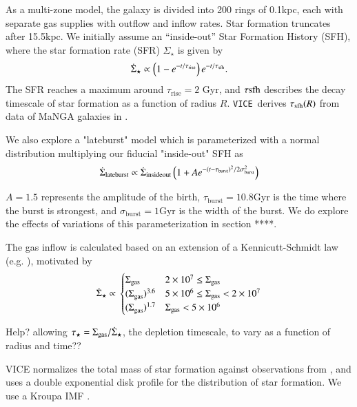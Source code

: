 \documentclass[12pt,oneside]{report}
\newcommand{\VICE}{\texttt{VICE}}
\begin{document}
As a multi-zone model, the galaxy is divided into 200 rings of 0.1kpc, each with separate gas supplies with outflow and inflow rates. Star formation truncates after 15.5kpc. We initially assume an ``inside-out'' Star Formation History (SFH), where the star formation rate (SFR) $\Sigma_\star$ is given by 
\begin{equation}
    \dot{\Sigma}_\star \propto \left(1-e^{-t/\tau_{\rm rise}}\right) e^{-t/\tau_{\rm sfh}}.
\end{equation}
The SFR reaches a maximum around $\tau_\text{rise}=2$ Gyr, and $\tau{\rm sfh}$ describes the decay timescale of star formation as a function of radius $R$. \VICE~derives $\tau_{\rm sfh}(R)$ from data of MaNGA galaxies in \cite{sanches20}.

We also explore a "lateburst" model which is parameterized with a normal distribution multiplying our fiducial "inside-out" SFH as
\begin{equation}\label{eq:lateburst}
    \dot{\Sigma}_{\rm lateburst} \propto \dot{\Sigma}_{\rm insideout} \left(1 + A e^{-(t-\tau_{\rm burst})^2/2\sigma^2_{\rm burst}} \right)
\end{equation}

$A=1.5$ represents the amplitude of the birth, $\tau_\text{burst}=10.8$Gyr is the time where the burst is strongest, and $\sigma_\text{burst}=1$Gyr is the width of the burst. We do explore the effects of variations of this parameterization in section ****.


The gas inflow is calculated based on an extension of a Kennicutt-Schmidt law (e.g. \cite{kennicutt98}), motivated by 
\begin{equation}
\dot{\Sigma}_{\star} \propto \\
\begin{cases}
    {\Sigma}_{\rm gas} & 2\times 10^7 \leq \Sigma_{\rm gas} \\ 
    {(\Sigma}_{\rm gas})^{3.6} & 5\times 10^6 \leq \Sigma_{\rm gas} < 2\times10^7 \\ 
    {(\Sigma}_{\rm gas})^{1.7} & \Sigma_{\rm gas} < 5\times10^6 \\ 
\end{cases}
\end{equation}

Help? allowing $\tau_\star = \Sigma_{\rm gas}/\dot{\Sigma}_{\star}$, the depletion timescale, to vary as a function of radius and time??

VICE normalizes the total mass of star formation against observations from \cite{LM15}, and uses a double exponential disk profile for the distribution of star formation.  We use a Kroupa IMF \cite{kroupa01}.
\end{document}
